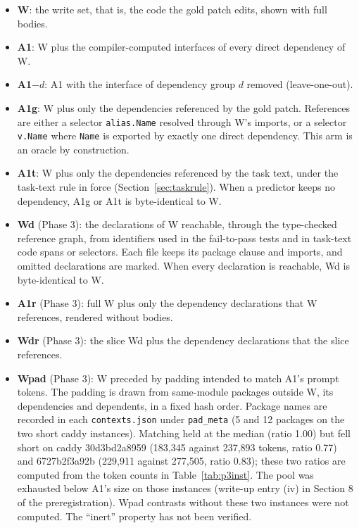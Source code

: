 \begin{itemize}
\item \textbf{W}: the write set, that is, the code the gold patch edits, shown with full bodies.
\item \textbf{A1}: W plus the compiler-computed interfaces of every direct dependency of W.
\item \textbf{A1$-d$}: A1 with the interface of dependency group $d$ removed (leave-one-out).
\item \textbf{A1g}: W plus only the dependencies referenced by the gold patch. References are either a selector \texttt{alias.Name} resolved through W's imports, or a selector \texttt{v.Name} where \texttt{Name} is exported by exactly one direct dependency. This arm is an oracle by construction.
\item \textbf{A1t}: W plus only the dependencies referenced by the task text, under the task-text rule in force (Section~\ref{sec:taskrule}). When a predictor keeps no dependency, A1g or A1t is byte-identical to W.
\item \textbf{Wd} (Phase 3): the declarations of W reachable, through the type-checked reference graph, from identifiers used in the fail-to-pass tests and in task-text code spans or selectors. Each file keeps its package clause and imports, and omitted declarations are marked. When every declaration is reachable, Wd is byte-identical to W.
\item \textbf{A1r} (Phase 3): full W plus only the dependency declarations that W references, rendered without bodies.
\item \textbf{Wdr} (Phase 3): the slice Wd plus the dependency declarations that the slice references.
\item \textbf{Wpad} (Phase 3): W preceded by padding intended to match A1's prompt tokens. The padding is drawn from same-module packages outside W, its dependencies and dependents, in a fixed hash order. Package names are recorded in each \texttt{contexts.json} under \texttt{pad\_meta} (5 and 12 packages on the two short caddy instances). Matching held at the median (ratio 1.00) but fell short on caddy 30d3bd2a8959 (183,345 against 237,893 tokens, ratio 0.77) and 6727b2f3a92b (229,911 against 277,505, ratio 0.83); these two ratios are computed from the token counts in Table~\ref{tab:p3inst}. The pool was exhausted below A1's size on those instances (write-up entry (iv) in Section 8 of the preregistration). Wpad contrasts without these two instances were not computed. The ``inert'' property has not been verified.
\end{itemize}

